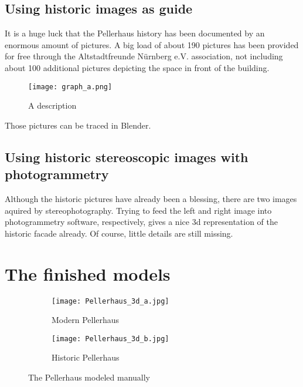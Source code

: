 \subsection{Using historic images as guide}

It is a huge luck that the Pellerhaus history has been documented by an enormous amount of pictures. A big load of about 190 pictures has been provided for free through the Altstadtfreunde Nürnberg e.V. association, not including about 100 additional pictures depicting the space in front of the building.


\begin{figure}[h]
	\centering
	\texttt{[image: graph\_a.png]}
	\caption{A description}
	\label{fig:something}
\end{figure}

Those pictures can be traced in Blender.

\subsection{Using historic stereoscopic images with photogrammetry}

Although the historic pictures have already been a blessing, there are two images aquired by stereophotography. Trying to feed the left and right image into photogrammetry software, respectively, gives a nice 3d representation of the historic facade already. Of course, little details are still missing.






\section{The finished models}



\begin{figure}[h]
	\centering
	\begin{subfigure}[b]{0.45\textwidth}
		\centering
		\texttt{[image: Pellerhaus\_3d\_a.jpg]}
		\caption{Modern Pellerhaus}
		\label{fig:pellerhaus_3d_modern}
	\end{subfigure}
	\hfill
	\begin{subfigure}[b]{0.45\textwidth}
		\centering
		\texttt{[image: Pellerhaus\_3d\_b.jpg]}
		\caption{Historic Pellerhaus}
		\label{fig:pellerhaus_3d_historic}
	\end{subfigure}
	\caption{The Pellerhaus modeled manually}
	\label{fig:pellerhaus_3d_models}
\end{figure}







